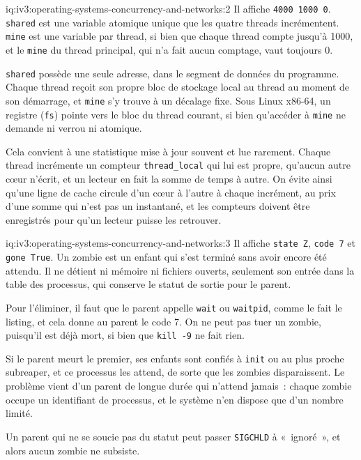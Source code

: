 \begin{solution}{iq:iv3:operating-systems-concurrency-and-networks:2}
Il affiche \texttt{4000 1000 0}. \texttt{shared} est une variable atomique unique que les quatre threads incrémentent. \texttt{mine} est une variable par thread, si bien que chaque thread compte jusqu'à 1000, et le \texttt{mine} du thread principal, qui n'a fait aucun comptage, vaut toujours 0.

\texttt{shared} possède une seule adresse, dans le segment de données du programme. Chaque thread reçoit son propre bloc de stockage local au thread au moment de son démarrage, et \texttt{mine} s'y trouve à un décalage fixe. Sous Linux x86-64, un registre (\texttt{fs}) pointe vers le bloc du thread courant, si bien qu'accéder à \texttt{mine} ne demande ni verrou ni atomique.

Cela convient à une statistique mise à jour souvent et lue rarement. Chaque thread incrémente un compteur \texttt{thread\_local} qui lui est propre, qu'aucun autre cœur n'écrit, et un lecteur en fait la somme de temps à autre. On évite ainsi qu'une ligne de cache circule d'un cœur à l'autre à chaque incrément, au prix d'une somme qui n'est pas un instantané, et les compteurs doivent être enregistrés pour qu'un lecteur puisse les retrouver.

\end{solution}

\begin{solution}{iq:iv3:operating-systems-concurrency-and-networks:3}
Il affiche \texttt{state Z}, \texttt{code 7} et \texttt{gone True}. Un zombie est un enfant qui s'est terminé sans avoir encore été attendu. Il ne détient ni mémoire ni fichiers ouverts, seulement son entrée dans la table des processus, qui conserve le statut de sortie pour le parent.

Pour l'éliminer, il faut que le parent appelle \texttt{wait} ou \texttt{waitpid}, comme le fait le listing, et cela donne au parent le code 7. On ne peut pas tuer un zombie, puisqu'il est déjà mort, si bien que \texttt{kill -9} ne fait rien.

Si le parent meurt le premier, ses enfants sont confiés à \texttt{init} ou au plus proche subreaper, et ce processus les attend, de sorte que les zombies disparaissent. Le problème vient d'un parent de longue durée qui n'attend jamais~: chaque zombie occupe un identifiant de processus, et le système n'en dispose que d'un nombre limité.

Un parent qui ne se soucie pas du statut peut passer \texttt{SIGCHLD} à «~ignoré~», et alors aucun zombie ne subsiste.

\end{solution}

